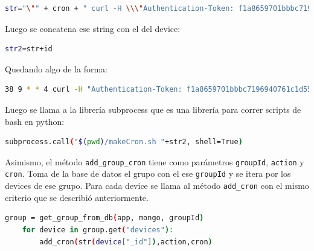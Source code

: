 \begin{lstlisting}[language=bash]
str="\"" + cron + " curl -H \\\"Authentication-Token: f1a8659701bbbc7196940761c1d55c3b9a25fb6569a863df\\\"  -X POST -d \'{\\\"state\\\":\\\""+action+"\\\",\\\"device_id\\\":\\\""+id+"\\\"}\' http://localhost:5000/set_switch_state\""
\end{lstlisting} 

Luego se concatena ese string con el del device:

\begin{lstlisting}[language=bash]
str2=str+id
\end{lstlisting}

Quedando algo de la forma: 

\begin{lstlisting}[language=bash]
38 9 * * 4 curl -H "Authentication-Token: f1a8659701bbbc7196940761c1d55c3b9a25fb6569a863df"  -X POST -d '{"state":"0","device_id":"12409587"}' http://localhost:5000/set_switch_state 12409587
\end{lstlisting}

Luego se llama a la librería subprocess que es una librería para correr scripts de bash en python:

\begin{lstlisting}[language=bash]
subprocess.call("$(pwd)/makeCron.sh "+str2, shell=True)
\end{lstlisting}

Asimismo, el método \lstinline[columns=fixed]{add_group_cron} tiene como parámetros \lstinline[columns=fixed]{groupId}, \lstinline[columns=fixed]{action} y \lstinline[columns=fixed]{cron}. Toma de la base de datos el grupo con el ese \lstinline[columns=fixed]{groupId} y se itera por los devices de ese grupo. Para cada device se llama al método \lstinline[columns=fixed]{add_cron} con el mismo criterio que se describió anteriormente.

\begin{lstlisting}[language=bash]
group = get_group_from_db(app, mongo, groupId)
    for device in group.get("devices"):
        add_cron(str(device["_id"]),action,cron)
\end{lstlisting}


